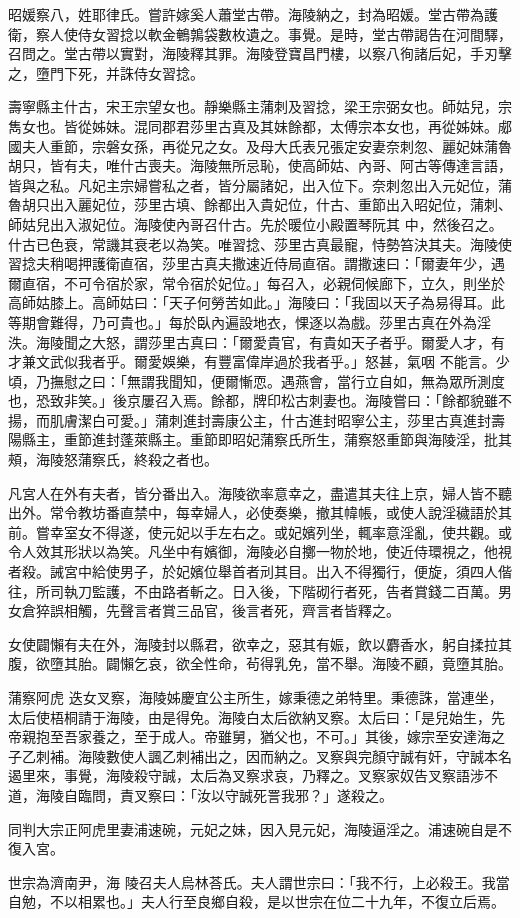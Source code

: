 \begin{pinyinscope}
 昭媛察八，姓耶律氏。嘗許嫁奚人蕭堂古帶。海陵納之，封為昭媛。堂古帶為護衛，察人使侍女習捻以軟金鵪鶉袋數枚遺之。事覺。是時，堂古帶謁告在河間驛，召問之。堂古帶以實對，海陵釋其罪。海陵登寶昌門樓，以察八徇諸后妃，手刃擊之，墮門下死，并誅侍女習捻。



 壽寧縣主什古，宋王宗望女也。靜樂縣主蒲刺及習捻，梁王宗弼女也。師姑兒，宗雋女也。皆從姊妹。混同郡君莎里古真及其妹餘都，太傅宗本女也，再從姊妹。郕國夫人重節，宗磐女孫，再從兄之女。及母大氏表兄張定安妻奈刺忽、麗妃妹蒲魯胡只，皆有夫，唯什古喪夫。海陵無所忌恥，使高師姑、內哥、阿古等傳達言語，皆與之私。凡妃主宗婦嘗私之者，皆分屬諸妃，出入位下。奈刺忽出入元妃位，蒲魯胡只出入麗妃位，莎里古填、餘都出入貴妃位，什古、重節出入昭妃位，蒲刺、師姑兒出入淑妃位。海陵使內哥召什古。先於暖位小殿置琴阮其
 中，然後召之。什古已色衰，常譏其衰老以為笑。唯習捻、莎里古真最寵，恃勢笞決其夫。海陵使習捻夫稍喝押護衛直宿，莎里古真夫撒速近侍局直宿。謂撒速曰：「爾妻年少，遇爾直宿，不可令宿於家，常令宿於妃位。」每召入，必親伺候廊下，立久，則坐於高師姑膝上。高師姑曰：「天子何勞苦如此。」海陵曰：「我固以天子為易得耳。此等期會難得，乃可貴也。」每於臥內遍設地衣，惈逐以為戲。莎里古真在外為淫泆。海陵聞之大怒，謂莎里古真曰：「爾愛貴官，有貴如天子者乎。爾愛人才，有才兼文武似我者乎。爾愛娛樂，有豐富偉岸過於我者乎。」怒甚，氣咽
 不能言。少頃，乃撫慰之曰：「無謂我聞知，便爾慚恧。遇燕會，當行立自如，無為眾所測度也，恐致非笑。」後京屢召入焉。餘都，牌印松古刺妻也。海陵嘗曰：「餘都貌雖不揚，而肌膚潔白可愛。」蒲刺進封壽康公主，什古進封昭寧公主，莎里古真進封壽陽縣主，重節進封蓬萊縣主。重節即昭妃蒲察氏所生，蒲察怒重節與海陵淫，批其頰，海陵怒蒲察氏，終殺之者也。



 凡宮人在外有夫者，皆分番出入。海陵欲率意幸之，盡遣其夫往上京，婦人皆不聽出外。常令教坊番直禁中，每幸婦人，必使奏樂，撤其幃帳，或使人說淫穢語於其
 前。嘗幸室女不得遂，使元妃以手左右之。或妃嬪列坐，輒率意淫亂，使共觀。或令人效其形狀以為笑。凡坐中有嬪御，海陵必自擲一物於地，使近侍環視之，他視者殺。誡宮中給使男子，於妃嬪位舉首者刓其目。出入不得獨行，便旋，須四人偕往，所司執刀監護，不由路者斬之。日入後，下階砌行者死，告者賞錢二百萬。男女倉猝誤相觸，先聲言者賞三品官，後言者死，齊言者皆釋之。



 女使闢懶有夫在外，海陵封以縣君，欲幸之，惡其有娠，飲以麝香水，躬自揉拉其腹，欲墮其胎。闢懶乞哀，欲全性命，茍得乳免，當不舉。海陵不顧，竟墮其胎。



 蒲察阿虎
 迭女叉察，海陵姊慶宜公主所生，嫁秉德之弟特里。秉德誅，當連坐，太后使梧桐請于海陵，由是得免。海陵白太后欲納叉察。太后曰：「是兒始生，先帝親抱至吾家養之，至于成人。帝雖舅，猶父也，不可。」其後，嫁宗至安達海之子乙刺補。海陵數使人諷乙刺補出之，因而納之。叉察與完顏守誠有奸，守誠本名遏里來，事覺，海陵殺守誠，太后為叉察求哀，乃釋之。叉察家奴告叉察語涉不道，海陵自臨問，責叉察曰：「汝以守誠死詈我邪？」遂殺之。



 同判大宗正阿虎里妻浦速碗，元妃之妹，因入見元妃，海陵逼淫之。浦速碗自是不復入宮。



 世宗為濟南尹，海
 陵召夫人烏林荅氏。夫人謂世宗曰：「我不行，上必殺王。我當自勉，不以相累也。」夫人行至良鄉自殺，是以世宗在位二十九年，不復立后焉。



\end{pinyinscope}